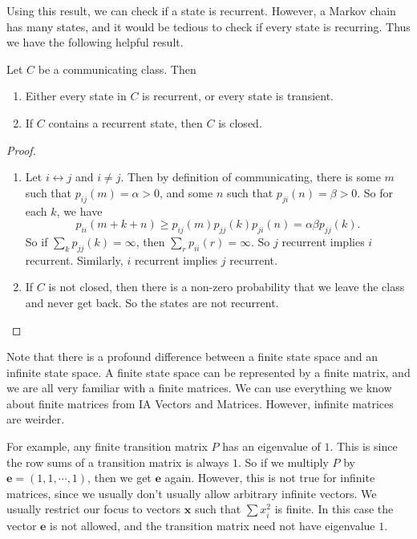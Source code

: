 \documentclass[a4paper]{article}
\begin{document}
Using this result, we can check if a state is recurrent. However, a Markov chain has many states, and it would be tedious to check if every state is recurring. Thus we have the following helpful result.
\begin{thm}[]
  Let $C$ be a communicating class. Then
  \begin{enumerate}
    \item Either every state in $C$ is recurrent, or every state is transient.
    \item If $C$ contains a recurrent state, then $C$ is closed.
  \end{enumerate}
\end{thm}

\begin{proof}\leavevmode
  \begin{enumerate}
    \item Let $i \leftrightarrow j$ and $i \not =j$. Then by definition of communicating, there is some $m$ such that $p_{ij}(m) = \alpha > 0$, and some $n$ such that $p_{ji}(n) = \beta > 0$. So for each $k$, we have
      \[
        p_{ii}(m + k + n) \geq p_{ij}(m) p_{jj}(k) p_{ji}(n) = \alpha\beta p_{jj}(k).
      \]
      So if $\sum_k p_{jj}(k) = \infty$, then $\sum_r p_{ii}(r) = \infty$. So $j$ recurrent implies $i$ recurrent. Similarly, $i$ recurrent implies $j$ recurrent.
    \item If $C$ is not closed, then there is a non-zero probability that we leave the class and never get back. So the states are not recurrent.
  \end{enumerate}
\end{proof}

Note that there is a profound difference between a finite state space and an infinite state space. A finite state space can be represented by a finite matrix, and we are all very familiar with a finite matrices. We can use everything we know about finite matrices from IA Vectors and Matrices. However, infinite matrices are weirder.

For example, any finite transition matrix $P$ has an eigenvalue of $1$. This is since the row sums of a transition matrix is always $1$. So if we multiply $P$ by $\mathbf{e} = (1, 1, \cdots, 1)$, then we get $\mathbf{e}$ again. However, this is not true for infinite matrices, since we usually don't usually allow arbitrary infinite vectors. We usually restrict our focus to vectors $\mathbf{x}$ such that $\sum x_i^2$ is finite. In this case the vector $\mathbf{e}$ is not allowed, and the transition matrix need not have eigenvalue $1$.
\end{document}
